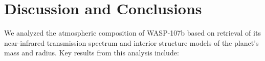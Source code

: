 \documentclass[twocolumn, trackchanges]{aastex61}
\begin{document}

\section{Discussion and Conclusions} \label{sec:discuss}
We analyzed the atmospheric composition of WASP-107b based on retrieval of its near-infrared transmission spectrum and interior structure models of the planet's mass and radius.  Key results from this analysis include:
\end{document}
